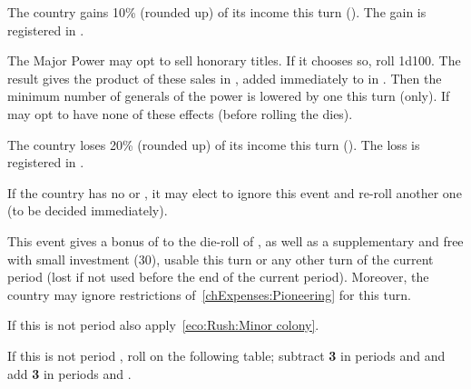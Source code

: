 
The country gains 10\% (rounded up) of its income this turn
(). The gain is registered in .




The Major Power may opt to sell honorary titles. If it chooses so, roll 1d100.
The result gives the product of these sales in \xducats, added immediately to
 in .  Then the
minimum number of generals of the power is lowered by one this turn (only).
If may opt to have none of these effects (before rolling the dies).




The country loses 20\% (rounded up) of its income this turn
(). The loss is registered in .




If the country has no \COLaction or \TPaction, it may elect to ignore this
event and re-roll another one (to be decided immediately).

This event gives a bonus of  to the die-roll of \COLaction, as well
as a supplementary and free \COLaction with small investment (30\ducats),
usable this turn or any other turn of the current period (lost if not used
before the end of the current period). Moreover, the country may ignore
restrictions of~\ref{chExpenses:Pioneering} for this turn.

If this is not period  also apply~\ref{eco:Rush:Minor colony}.



If this is not period , roll on the following table; subtract {\bf
  3} in periods  and  and add {\bf 3} in periods
 and .

